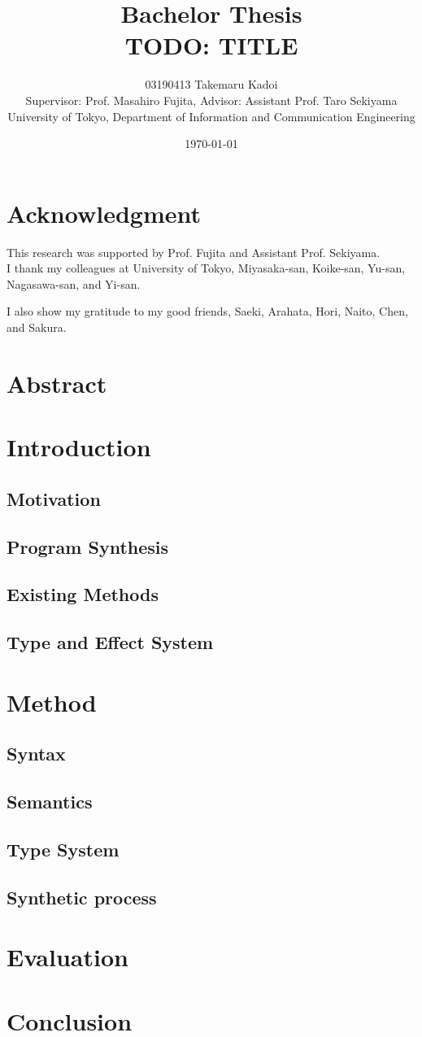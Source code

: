 \documentclass[10pt, a4paper, titlepage]{article}
\title{Bachelor Thesis \\ TODO: TITLE}
\author{
03190413 Takemaru Kadoi 
\\[1cm]
{\small Supervisor: Prof. Masahiro Fujita},
{\small Advisor: Assistant Prof. Taro Sekiyama}
\\[1cm]
{\small University of Tokyo, Department of Information and Communication Engineering}}
\date{\today}
\begin{document}
\maketitle
\newpage
\tableofcontents
\newpage

\section{Acknowledgment} %
This research was supported by Prof. Fujita and Assistant Prof. Sekiyama. \\
I thank my colleagues at University of Tokyo, Miyasaka-san, Koike-san, Yu-san, Nagasawa-san, and Yi-san.

I also show my gratitude to my good friends, Saeki, Arahata, Hori, Naito, Chen, and Sakura.

\section{Abstract} %

\cite{gulwani2017program}

\section{Introduction} %
\subsection{Motivation}
\subsection{Program Synthesis}
\subsection{Existing Methods}
\subsection{Type and Effect System}

\section{Method} %
\subsection{Syntax}
\subsection{Semantics}
\subsection{Type System}
\subsection{Synthetic process}
\section{Evaluation} %
\section{Conclusion} %


\end{document}
